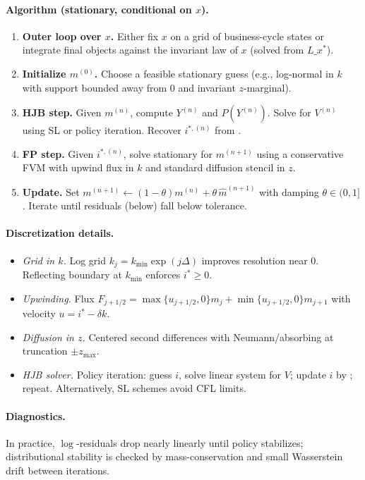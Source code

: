 \documentclass[11pt,letterpaper,oneside]{article}
\numberwithin{equation}{section}
\newcommand{\ac}[1]{{\mdseries\textsc{#1}}}
\newcommand{\1}{\mathbf{1}}
\newcommand{\Lx}{L\_x}
\begin{document}
\paragraph{Algorithm (stationary, conditional on $x$).}
\begin{enumerate}[leftmargin=1.5em,label=\textbf{A.\arabic*}]
\item \textbf{Outer loop over $x$.} Either fix $x$ on a grid of business-cycle states or integrate final objects against the invariant law of $x$ (solved from $\Lx^\ast$).
\item \textbf{Initialize $m^{(0)}$.} Choose a feasible stationary guess (e.g., log-normal in $k$ with support bounded away from $0$ and invariant $z$-marginal).
\item \textbf{HJB step.} Given $m^{(n)}$, compute $Y^{(n)}$ and $P(Y^{(n)})$. Solve  for $V^{(n)}$ using \ac{SL} or policy iteration. Recover $i^{*,(n)}$ from .
\item \textbf{FP step.} Given $i^{*,(n)}$, solve stationary  for $m^{(n+1)}$ using a conservative \ac{FVM} with upwind flux in $k$ and standard diffusion stencil in $z$.
\item \textbf{Update.} Set $m^{(n+1)}\leftarrow (1-\theta)m^{(n)}+\theta\,\widehat m^{(n+1)}$ with damping $\theta\in(0,1]$. Iterate until residuals (below) fall below tolerance.
\end{enumerate}

\paragraph{Discretization details.}
\begin{itemize}[leftmargin=1.25em]
\item \emph{Grid in $k$.} Log grid $k_j=k_{\min}\exp(j\Delta)$ improves resolution near $0$. Reflecting boundary at $k_{\min}$ enforces $i^*\!\ge 0$.
\item \emph{Upwinding.} Flux $F_{j+1/2}=\max\{u_{j+1/2},0\}m_j+\min\{u_{j+1/2},0\}m_{j+1}$ with velocity $u=i^*-\delta k$.
\item \emph{Diffusion in $z$.} Centered second differences with Neumann/absorbing at truncation $\pm z_{\max}$.
\item \emph{HJB solver.} Policy iteration: guess $i$, solve linear system for $V$; update $i$ by ; repeat. Alternatively, \ac{SL} schemes avoid CFL limits.
\end{itemize}

\paragraph{Diagnostics.} In practice, $\log$-residuals drop nearly linearly until policy stabilizes; distributional stability is checked by mass-conservation and small Wasserstein drift between iterations.
\end{document}
